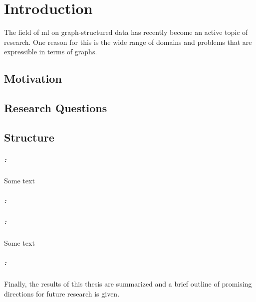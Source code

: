 \chapter{Introduction}%
\label{sec:intro}

\setcounter{page}{1}			%

The field of \acs{ml} on graph-structured data has recently become an active topic of research.
One reason for this is the wide range of domains and problems that are expressible in terms of graphs.


\section{Motivation}%
\label{sec:intro:motivation}


\section{Research Questions}%
\label{sec:intro:questions}


\section{Structure}%
\label{sec:intro:structure}

\paragraph{: }
Some text
\paragraph{: }
\paragraph{: }
Some text

\paragraph{: }
Finally, the results of this thesis are summarized and a brief outline of promising directions for future research is given.
